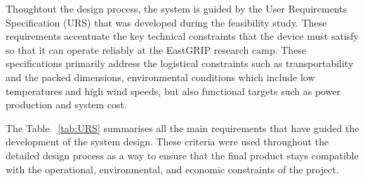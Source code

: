 \documentclass[11pt,a4paper]{article}
\begin{document}
Thoughtout the design process, the system is guided by the User Requirements Specification (URS) that was developed during the feasibility study. These requirements accentuate the key technical constraints that the device must satisfy so that it can operate reliably at the EastGRIP research camp. These specifications primarily address the logistical constraints such as transportability and the packed dimensions, environmental conditions which include low temperatures and high wind speeds, but also functional targets such as power production and system cost.

The Table ~\ref{tab:URS} summarises all the main requirements that have guided the development of the system design. These criteria were used throughout the detailed design process as a way to ensure that the final product stays compatible with the operational, environmental, and economic constraints of the project.
\end{document}
